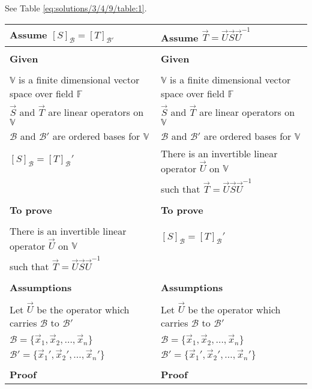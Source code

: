 See Table \ref{eq:solutions/3/4/9/table:1}.

\begin{table*}[h!]
\begin{center}
\begin{tabular}{|l|l|}
\hline
Assume $[S]_\mathcal{B} = [T]_\mathcal{B'}$ & Assume $\vec{T} = \vec{U}\vec{S}\vec{U}^{-1}$\\[0.5ex]\hline
 & \\
\textbf{Given}&\textbf{Given}\\
 & \\
$\mathbb V$ is a finite dimensional vector space over field $\mathbb F$ & $\mathbb V$ is a finite dimensional vector space over field $\mathbb F$\\ $\vec{S}$ and $\vec{T}$ are linear operators on $\mathbb V$ & $\vec{S}$ and $\vec{T}$ are linear operators on $\mathbb V$\\
$\mathcal{B}$ and $\mathcal{B}'$ are ordered bases for $\mathbb V$ & $\mathcal{B}$ and $\mathcal{B}'$ are ordered bases for $\mathbb V$\\
$[S]_\mathcal{B} = [T]_\mathcal{B}'$ & There is an invertible linear operator $\vec{U}$ on $\mathbb V$\\
 &  such that $\vec{T} = \vec{U}\vec{S}\vec{U}^{-1}$\\ [0.5ex] \hline
  & \\
\textbf{To prove}&\textbf{To prove}\\
 & \\
There is an invertible linear operator $\vec{U}$ on $\mathbb V$ & $[S]_\mathcal{B} = [T]_\mathcal{B}'$\\
such that $\vec{T} = \vec{U}\vec{S}\vec{U}^{-1}$ & \\ [0.5ex] \hline
 & \\
\textbf{Assumptions}&\textbf{Assumptions}\\
 & \\
Let $\vec{U}$ be the operator which carries $\mathcal{B}$ to $\mathcal{B}'$ &
Let $\vec{U}$ be the operator which carries $\mathcal{B}$ to $\mathcal{B}'$\\
$\mathcal{B} = \{\vec{x}_1,\vec{x}_2,\ldots,\vec{x}_n\}$ &
$\mathcal{B} = \{\vec{x}_1,\vec{x}_2,\ldots,\vec{x}_n\}$\\
$\mathcal{B}' = \{\vec{x}_1',\vec{x}_2',\ldots,\vec{x}_n'\}$ &
$\mathcal{B}' = \{\vec{x}_1',\vec{x}_2',\ldots,\vec{x}_n'\}$\\ [0.5ex] \hline
 & \\
\textbf{Proof}&\textbf{Proof}\\

\end{tabular}
\end{center}
\end{table*}
